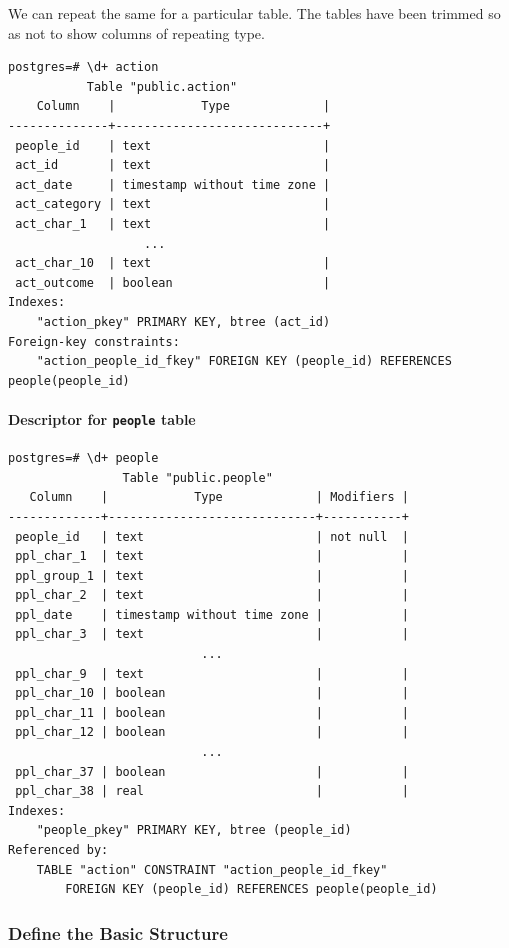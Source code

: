 \documentclass[]{report}
\begin{document}
We can repeat the same for a particular table. The tables have been
trimmed so as not to show columns of repeating type.

\begin{verbatim}
postgres=# \d+ action
           Table "public.action"
    Column    |            Type             | 
--------------+-----------------------------+
 people_id    | text                        | 
 act_id       | text                        | 
 act_date     | timestamp without time zone | 
 act_category | text                        | 
 act_char_1   | text                        | 
                   ...
 act_char_10  | text                        | 
 act_outcome  | boolean                     | 
Indexes:
    "action_pkey" PRIMARY KEY, btree (act_id)
Foreign-key constraints:
    "action_people_id_fkey" FOREIGN KEY (people_id) REFERENCES people(people_id)
\end{verbatim}

\paragraph{Descriptor for \texttt{people}
table}\label{descriptor-for-people-table}

\begin{verbatim}
postgres=# \d+ people
                Table "public.people"
   Column    |            Type             | Modifiers |
-------------+-----------------------------+-----------+
 people_id   | text                        | not null  |
 ppl_char_1  | text                        |           |
 ppl_group_1 | text                        |           |
 ppl_char_2  | text                        |           |
 ppl_date    | timestamp without time zone |           |
 ppl_char_3  | text                        |           |
                           ...
 ppl_char_9  | text                        |           |
 ppl_char_10 | boolean                     |           |
 ppl_char_11 | boolean                     |           |
 ppl_char_12 | boolean                     |           |
                           ...
 ppl_char_37 | boolean                     |           |
 ppl_char_38 | real                        |           |
Indexes:
    "people_pkey" PRIMARY KEY, btree (people_id)
Referenced by:
    TABLE "action" CONSTRAINT "action_people_id_fkey" 
        FOREIGN KEY (people_id) REFERENCES people(people_id)
\end{verbatim}

\pagebreak 

\subsubsection{Define the Basic
Structure}\label{define-the-basic-structure}
\end{document}
